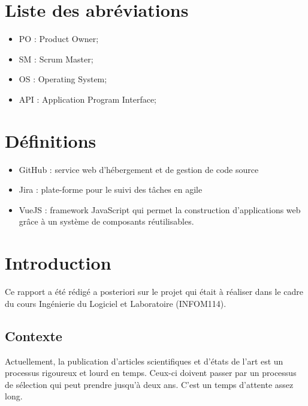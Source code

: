 \documentclass[t, 12pt, usenames,dvipsnames]{article}
\begin{document}
    \newpage
    \tableofcontents
    
    \newpage
    \section{Liste des abréviations}
        \begin{itemize}
            \item PO : Product Owner;
            \item SM : Scrum Master;
            \item OS : Operating System;
            \item API : Application Program Interface;
        \end{itemize}
    
    \section{Définitions}
        \begin{itemize}
            \item GitHub : service web d'hébergement et de gestion de code source
            \item Jira : plate-forme pour le suivi des tâches en agile
            \item VueJS : framework JavaScript qui permet la construction d'applications web grâce à un système de composants réutilisables.
        \end{itemize}
    \newpage
    \section{Introduction}
    
    \noindent Ce rapport a été rédigé a posteriori sur le projet qui était à réaliser dans le cadre du cours Ingénierie du Logiciel et Laboratoire (INFOM114).
    
        \subsection{Contexte}
            \noindent Actuellement, la publication d'articles scientifiques et d'états de l'art est un processus rigoureux et lourd en temps. Ceux-ci doivent passer par un processus de sélection qui peut prendre jusqu'à deux ans. C'est un temps d'attente assez long.
            
\end{document}
